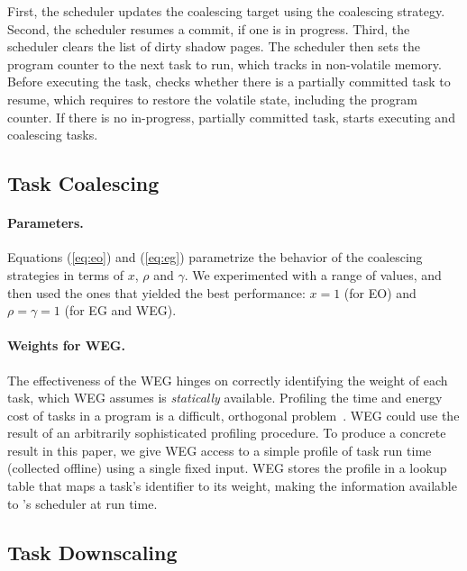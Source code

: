 First, the scheduler updates the coalescing target using the coalescing
strategy.  Second, the scheduler resumes a commit, if one is in progress. Third,
the scheduler clears the list of dirty shadow pages. The scheduler then 
sets the program counter to the next task to run, which \sys tracks in  
non-volatile memory.  
%
Before executing the task, \sys checks whether there is a partially committed
task to resume, which requires \sys to restore the volatile state, including the program
counter.  
%
If there is no in-progress, partially committed task, \sys starts executing and
coalescing tasks. 

%
\subsection{Task Coalescing}
%
%
\paragraph{Parameters.}
Equations (\ref{eq:eo}) and (\ref{eq:eg}) parametrize the behavior of the coalescing strategies in terms of $x$, $\rho$ and $\gamma$.
We experimented with a range of values, and then used the ones that yielded the best performance: $x = 1$ (for EO) and $\rho = \gamma = 1$ (for EG and WEG).

\paragraph{Weights for WEG.}
The effectiveness of the WEG hinges on correctly identifying the weight of each task, which WEG assumes is {\em statically} available. Profiling the time and energy cost of tasks in a program is a difficult, orthogonal problem~\cite{cleancut_2018,baghsorkhi_cgo_2018}. WEG could use the result of an arbitrarily sophisticated profiling procedure. To produce a concrete result in this paper, we give WEG access to a simple profile of task run time (collected offline) using a single fixed input. WEG stores the profile in a lookup table that maps a task's identifier to its weight, making the information available to \sys's scheduler at run time.

%
\subsection{Task Downscaling}
%
%
